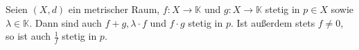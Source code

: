 Seien $(X, d)$ ein metrischer Raum, $f: X \to \mathbb{K}$ und $g: X \to \mathbb{K}$ stetig in $p \in X$ sowie $\lambda \in \mathbb{K}$. Dann sind auch $f+g, \lambda \cdot f$ und $f \cdot g$ stetig in $p$. Ist außerdem stets $f \neq 0$, so ist auch $\frac{1}{f}$ stetig in $p$.